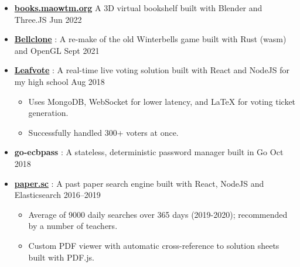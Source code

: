   \begin{itemize}

    \item \href{https://books.maowtm.org}{\textbf{\color{link}books.maowtm.org}}  \dashdiv{} A 3D virtual bookshelf built with Blender and Three.JS \dashdiv{} Jun 2022

    \item \href{https://bellclone.maowtm.org/}{\color{link}\textbf{Bellclone}} : A re-make of the old Winterbells game built with Rust (wasm) and OpenGL \dashdiv{} Sept 2021

    \item \href{https://leafvote.mww.moe}{\color{link}\textbf{Leafvote}} : A real-time live voting solution built with React and NodeJS for my high school \dashdiv{} Aug 2018

    \begin{itemize}
      \item Uses MongoDB, WebSocket for lower latency, and LaTeX for voting ticket generation.
      \item Successfully handled 300+ voters at once.
    \end{itemize}

    \item \textbf{go-ecbpass} : A stateless, deterministic password manager built in Go \dashdiv{} Oct 2018

    \item \href{https://paper.sc}{\color{link}\textbf{paper.sc}} : A past paper search engine built with React, NodeJS and Elasticsearch \dashdiv{} 2016--2019

    \begin{itemize}
      \item Average of \raisebox{0.2\baselineskip}{\texttildelow}9000 daily searches over 365 days (2019-2020); recommended by a number of teachers.
      \item Custom PDF viewer with automatic cross-reference to solution sheets built with PDF.js.
    \end{itemize}

  \end{itemize}


